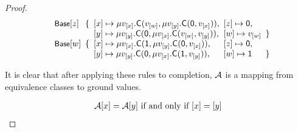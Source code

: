 \begin{proof}
\[\begin{array}{l@{\hspace{.5em}}l@{\hspace{.5em}}l@{\hspace{.5em}}l@{\hspace{.5em}}l}
\rn{Base} \ec{z}
& \{ & \ec{x} \mapsto \mu v_{\ec{x}}. \const{C}( v_{\ec{w}}, \mu v_{\ec{y}}. \const{C}( \const{0}, v_{\ec{x}} ) ), & \ec{z} \mapsto \const{0}, \\
&    & \ec{y} \mapsto \mu v_{\ec{y}}. \const{C}( \const{0}, \mu v_{\ec{x}}. \const{C}( v_{\ec{w}}, v_{\ec{y}} ) ), & \ec{w} \mapsto v_{\ec{w}} & \} \\
\rn{Base} \ec{w}
& \{ & \ec{x} \mapsto \mu v_{\ec{x}}. \const{C}( \const{1}, \mu v_{\ec{y}}. \const{C}( \const{0}, v_{\ec{x}} ) ), & \ec{z} \mapsto \const{0}, \\
&    & \ec{y} \mapsto \mu v_{\ec{y}}. \const{C}( \const{0}, \mu v_{\ec{x}}. \const{C}( \const{1}, v_{\ec{y}} ) ), & \ec{w} \mapsto \const{1} & \} \\
\end{array}\]


It is clear that after applying these rules to completion, $\mathcal{A}$ is a mapping from equivalence classes to ground values.




\begin{eqnarray} \label{eqn:m-bij-dt}
\mathcal{A} [ x ] = \mathcal{A} [ y ] \text{ if and only if } [ x ] = [ y ]
\end{eqnarray}

\begin{comment}
We assume that:
\begin{enumerate}
\item Each equivalence class of $\Fc$ contains at least one variable,
\item Each equivalence class $\ec{x}$ of $\Fc$ where $x : \tau$, $\tau \in \Nondata$ contains a constant,
\item Each equivalence class $\ec{x}$ of $\Fc$ where $x : \tau$, $\tau \in \Data \cup \Codata$ contains a constructor term.
\end{enumerate}
The first statement comes with no loss of generality since new equalities of the form $y \teq t$ for fresh variable $y$ can be added to $\Fc$ without affecting its satisfiability.
The second statement can be assumed for $x : \tau$, since $\tau$ is infinite.
Hence, we can assign constants for each such equivalence class.
Moreover, since $\Fc$ contains $\thD$-constraints only, these constants can be chosen arbitrarily.
The third statement can be assumed by \rem{TODO}.


\end{comment}
\end{proof}
